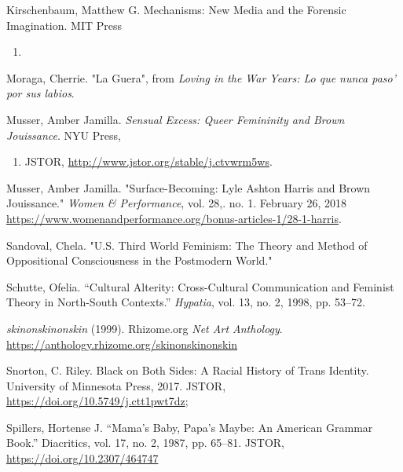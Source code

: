 \documentclass[11pt]{article}
\begin{document}
Kirschenbaum, Matthew G. Mechanisms: New Media and the Forensic Imagination. MIT Press 
\begin{enumerate}
\item 
\end{enumerate}

Moraga, Cherrie. "La Guera", from \emph{Loving in the War Years: Lo que
nunca paso' por sus labios}.

Musser, Amber Jamilla. \emph{Sensual Excess: Queer Femininity and Brown
Jouissance}. NYU Press,
\begin{enumerate}
\item JSTOR, \url{http://www.jstor.org/stable/j.ctvwrm5ws}.
\end{enumerate}

Musser, Amber Jamilla. "Surface-Becoming: Lyle Ashton Harris and Brown
  Jouissance." \emph{Women \& Performance}, vol. 28,. no. 1. February 26, 2018
  \url{https://www.womenandperformance.org/bonus-articles-1/28-1-harris}. 

Sandoval, Chela. "U.S. Third World Feminism: The Theory and Method of
Oppositional Consciousness in the Postmodern World."

Schutte, Ofelia. “Cultural Alterity: Cross-Cultural Communication and
Feminist Theory in North-South Contexts.” \emph{Hypatia}, vol. 13, no. 2,
1998, pp. 53–72.

\emph{skinonskinonskin} (1999). Rhizome.org \emph{Net Art Anthology}.
\url{https://anthology.rhizome.org/skinonskinonskin}

Snorton, C. Riley. Black on Both Sides: A Racial History of Trans Identity. University of 
Minnesota Press, 2017. JSTOR, \url{https://doi.org/10.5749/j.ctt1pwt7dz};

Spillers, Hortense J. “Mama’s Baby, Papa’s Maybe: An American Grammar Book.” Diacritics, 
vol. 17, no. 2, 1987, pp. 65–81. JSTOR, \url{https://doi.org/10.2307/464747}
\end{document}
